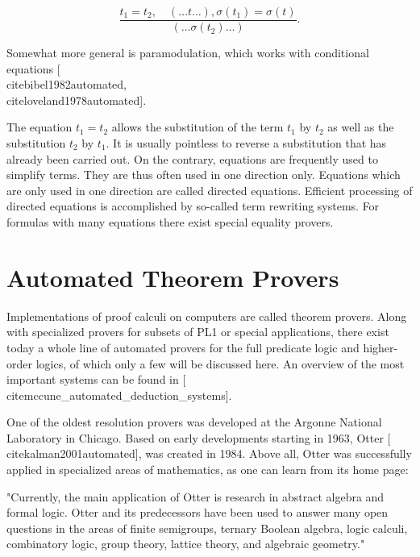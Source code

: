\documentclass[10pt]{book}
\begin{document}
$$
\frac{t_{1}=t_{2}, \quad(\ldots t \ldots), \sigma\left(t_{1}\right)=\sigma(t)}{\left(\ldots \sigma\left(t_{2}\right) \ldots\right)} .
$$

Somewhat more general is paramodulation, which works with conditional equations [\\cite{bibel1982automated}, \\cite{loveland1978automated}].

The equation $t_{1}=t_{2}$ allows the substitution of the term $t_{1}$ by $t_{2}$ as well as the substitution $t_{2}$ by $t_{1}$. It is usually pointless to reverse a substitution that has already been carried out. On the contrary, equations are frequently used to simplify terms. They are thus often used in one direction only. Equations which are only used in one direction are called directed equations. Efficient processing of directed equations is accomplished by so-called term rewriting systems. For formulas with many equations there exist special equality provers.

\section{Automated Theorem Provers}
Implementations of proof calculi on computers are called theorem provers. Along with specialized provers for subsets of PL1 or special applications, there exist today a whole line of automated provers for the full predicate logic and higher-order logics, of which only a few will be discussed here. An overview of the most important systems can be found in [\\cite{mccune_automated_deduction_systems}].

One of the oldest resolution provers was developed at the Argonne National Laboratory in Chicago. Based on early developments starting in 1963, Otter [\\cite{kalman2001automated}], was created in 1984. Above all, Otter was successfully applied in specialized areas of mathematics, as one can learn from its home page:

\begin{displayquote}
"Currently, the main application of Otter is research in abstract algebra and formal logic. Otter and its predecessors have been used to answer many open questions in the areas of finite semigroups, ternary Boolean algebra, logic calculi, combinatory logic, group theory, lattice theory, and algebraic geometry."
\end{displayquote}
\end{document}
